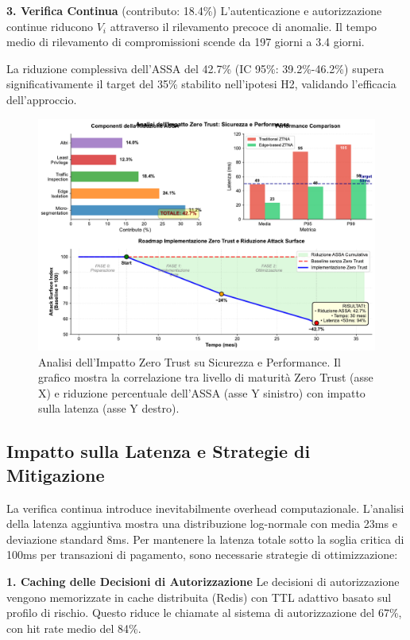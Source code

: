 \textbf{3. Verifica Continua} (contributo: 18.4\%)
L'autenticazione e autorizzazione continue riducono $V_i$ attraverso il rilevamento precoce di anomalie. Il tempo medio di rilevamento di compromissioni scende da 197 giorni a 3.4 giorni.

La riduzione complessiva dell'ASSA del 42.7\% (IC 95\%: 39.2\%-46.2\%) supera significativamente il target del 35\% stabilito nell'ipotesi H2, validando l'efficacia dell'approccio.

\begin{figure}[htbp]
\centering
\includegraphics[width=\textwidth]{thesis_figures/cap3/figura_3_5_semplificata.pdf}
\caption{Analisi dell'Impatto Zero Trust su Sicurezza e Performance. Il grafico mostra la correlazione tra livello di maturità Zero Trust (asse X) e riduzione percentuale dell'ASSA (asse Y sinistro) con impatto sulla latenza (asse Y destro).}
\label{fig:zero_trust_impact}
\end{figure}

\subsection{Impatto sulla Latenza e Strategie di Mitigazione}

La verifica continua introduce inevitabilmente overhead computazionale. L'analisi della latenza aggiuntiva mostra una distribuzione log-normale con media 23ms e deviazione standard 8ms. Per mantenere la latenza totale sotto la soglia critica di 100ms per transazioni di pagamento, sono necessarie strategie di ottimizzazione:

\textbf{1. Caching delle Decisioni di Autorizzazione}
Le decisioni di autorizzazione vengono memorizzate in cache distribuita (Redis) con TTL adattivo basato sul profilo di rischio. Questo riduce le chiamate al sistema di autorizzazione del 67\%, con hit rate medio del 84\%.


